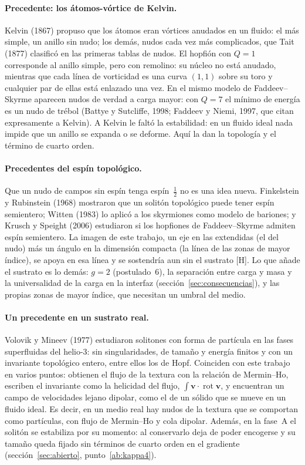 \documentclass[11pt,a4paper]{article}
\newcommand{\st}[1]{\textup{[#1]}}
\newcommand{\vb}[1]{\symbf{#1}}
\newcommand{\apartado}[1]{\paragraph{#1}}
\begin{document}
\apartado{Precedente: los átomos-vórtice de Kelvin.} Kelvin (1867) propuso que los átomos eran vórtices anudados en un fluido: el más simple, un anillo sin nudo; los demás, nudos cada vez más complicados, que Tait (1877) clasificó en las primeras tablas de nudos. El hopfión con $Q=1$ corresponde al anillo simple, pero con remolino: su núcleo no está anudado, mientras que cada línea de vorticidad es una curva $(1,1)$ sobre su toro y cualquier par de ellas está enlazado una vez. En el mismo modelo de Faddeev--Skyrme aparecen nudos de verdad a carga mayor: con $Q=7$ el mínimo de energía es un nudo de trébol (Battye y Sutcliffe, 1998; Faddeev y Niemi, 1997, que citan expresamente a Kelvin). A Kelvin le faltó la estabilidad: en un fluido ideal nada impide que un anillo se expanda o se deforme. Aquí la dan la topología y el término de cuarto orden.

\apartado{Precedentes del espín topológico.} Que un nudo de campos sin espín tenga espín~$\tfrac12$ no es una idea nueva. Finkelstein y Rubinstein (1968) mostraron que un solitón topológico puede tener espín semientero; Witten (1983) lo aplicó a los skyrmiones como modelo de bariones; y Krusch y Speight (2006) estudiaron si los hopfiones de Faddeev--Skyrme admiten espín semientero. La imagen de este trabajo, un eje en las extendidas (el del nudo) más un ángulo en la dimensión compacta (la línea de las zonas de mayor índice), se apoya en esa línea y se sostendría aun sin el sustrato \st{H}. Lo que añade el sustrato es lo demás: $g=2$ (postulado~6), la separación entre carga y masa y la universalidad de la carga en la interfaz (sección~\ref{sec:consecuencias}), y las propias zonas de mayor índice, que necesitan un umbral del medio.

\apartado{Un precedente en un sustrato real.} Volovik y Mineev (1977) estudiaron solitones con forma de partícula en las fases superfluidas del helio-3: sin singularidades, de tamaño y energía finitos y con un invariante topológico entero, entre ellos los de Hopf. Coinciden con este trabajo en varios puntos: obtienen el flujo de la textura con la relación de Mermin--Ho, escriben el invariante como la helicidad del flujo, $\int\vb{v}\cdot\operatorname{rot}\vb{v}$, y encuentran un campo de velocidades lejano dipolar, como el de un sólido que se mueve en un fluido ideal. Es decir, en un medio real hay nudos de la textura que se comportan como partículas, con flujo de Mermin--Ho y cola dipolar. Además, en la fase~A el solitón se estabiliza por su momento: al conservarlo deja de poder encogerse y su tamaño queda fijado sin términos de cuarto orden en el gradiente (sección~\ref{sec:abierto}, punto~\ref{ab:kappa4}).
\end{document}
